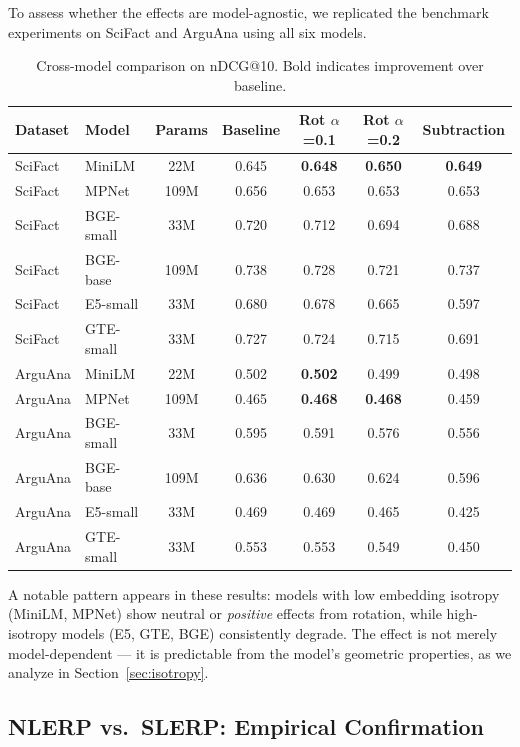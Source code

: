 \documentclass{article}
\begin{document}
To assess whether the effects are model-agnostic, we replicated the benchmark experiments on SciFact and ArguAna using all six models.

\begin{table}[ht]
\centering
\caption{Cross-model comparison on nDCG@10. Bold indicates improvement over baseline.}
\label{tab:cross_model}
\small
\begin{tabular}{llccccc}
\toprule
Dataset & Model & Params & Baseline & Rot $\alpha$=0.1 & Rot $\alpha$=0.2 & Subtraction \\
\midrule
SciFact & MiniLM & 22M & 0.645 & \textbf{0.648} & \textbf{0.650} & \textbf{0.649} \\
SciFact & MPNet & 109M & 0.656 & 0.653 & 0.653 & 0.653 \\
SciFact & BGE-small & 33M & 0.720 & 0.712 & 0.694 & 0.688 \\
SciFact & BGE-base & 109M & 0.738 & 0.728 & 0.721 & 0.737 \\
SciFact & E5-small & 33M & 0.680 & 0.678 & 0.665 & 0.597 \\
SciFact & GTE-small & 33M & 0.727 & 0.724 & 0.715 & 0.691 \\
\addlinespace
ArguAna & MiniLM & 22M & 0.502 & \textbf{0.502} & 0.499 & 0.498 \\
ArguAna & MPNet & 109M & 0.465 & \textbf{0.468} & \textbf{0.468} & 0.459 \\
ArguAna & BGE-small & 33M & 0.595 & 0.591 & 0.576 & 0.556 \\
ArguAna & BGE-base & 109M & 0.636 & 0.630 & 0.624 & 0.596 \\
ArguAna & E5-small & 33M & 0.469 & 0.469 & 0.465 & 0.425 \\
ArguAna & GTE-small & 33M & 0.553 & 0.553 & 0.549 & 0.450 \\
\bottomrule
\end{tabular}
\end{table}

A notable pattern appears in these results: models with low embedding isotropy (MiniLM, MPNet) show neutral or \emph{positive} effects from rotation, while high-isotropy models (E5, GTE, BGE) consistently degrade. The effect is not merely model-dependent --- it is predictable from the model's geometric properties, as we analyze in Section~\ref{sec:isotropy}.

\subsection{NLERP vs.\ SLERP: Empirical Confirmation}
\end{document}
